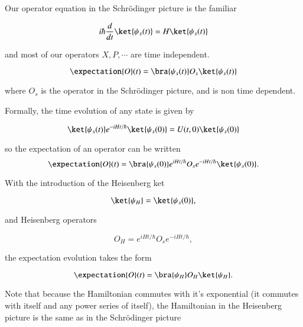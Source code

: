Our operator equation in the Schr\"{o}dinger picture is the familiar

\begin{equation}\label{eqn:qmTwoL5:220}
i \hbar \frac{d}{dt} \ket{\psi_s(t)} = H \ket{\psi_s(t)}
\end{equation}

and most of our operators $X, P, \cdots$ are time independent.

\begin{equation}\label{eqn:qmTwoL5:240}
\expectation{O}(t) = 
\bra{\psi_s(t)} O_s
\ket{\psi_s(t)}
\end{equation}

where $O_s$ is the operator in the Schr\"{o}dinger picture, and is non time dependent.

Formally, the time evolution of any state is given by

\begin{equation}\label{eqn:qmTwoL5:260}
\ket{\psi_s(t)}
e^{-i H t/\hbar}
\ket{\psi_s(0)} = U(t, 0) \ket{\psi_s(0)} 
\end{equation}

so the expectation of an operator can be written
\begin{equation}\label{eqn:qmTwoL5:280}
\expectation{O}(t) = 
\bra{\psi_s(0)} 
e^{i H t/\hbar}
O_s
e^{-i H t/\hbar}
\ket{\psi_s(0)}.
\end{equation}

With the introduction of the Heisenberg ket

\begin{equation}\label{eqn:qmTwoL5:300}
\ket{\psi_H} = \ket{\psi_s(0)},
\end{equation}

and Heisenberg operators

\begin{equation}\label{eqn:qmTwoL5:320}
O_H = e^{i H t/\hbar} O_s e^{-i H t/\hbar},
\end{equation}

the expectation evolution takes the form

\begin{equation}\label{eqn:qmTwoL5:340}
\expectation{O}(t) = 
\bra{\psi_H} 
O_H
\ket{\psi_H}.
\end{equation}

Note that because the Hamiltonian commutes with it's exponential (it commutes with itself and any power series of itself), the Hamiltonian in the Heisenberg picture is the same as in the Schr\"{o}dinger picture

